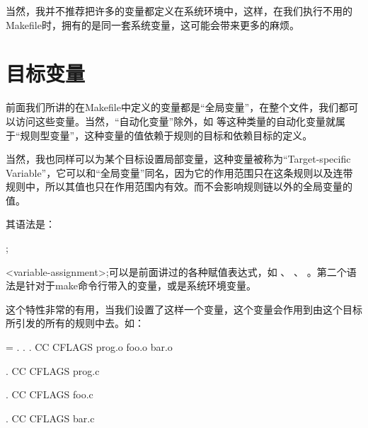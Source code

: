 \documentclass[a4paper,10pt]{sphinxmanual}
\begin{document}
当然，我并不推荐把许多的变量都定义在系统环境中，这样，在我们执行不用的Makefile时，拥有的是同一套系统变量，这可能会带来更多的麻烦。


\section{目标变量}
\label{\detokenize{variables:id8}}
前面我们所讲的在Makefile中定义的变量都是“全局变量”，在整个文件，我们都可以访问这些变量。当然，“自动化变量”除外，如 \sphinxcode{\sphinxupquote{\$\textless{}}} 等这种类量的自动化变量就属于“规则型变量”，这种变量的值依赖于规则的目标和依赖目标的定义。

当然，我也同样可以为某个目标设置局部变量，这种变量被称为“Target-specific Variable”，它可以和“全局变量”同名，因为它的作用范围只在这条规则以及连带规则中，所以其值也只在作用范围内有效。而不会影响规则链以外的全局变量的值。

其语法是：

\begin{sphinxVerbatim}[commandchars=\\\{\}]
 \PYGZlt{}\PYGZhy{}\PYGZgt{};

  \PYGZlt{}\PYGZhy{}\PYGZgt{}
\end{sphinxVerbatim}

\textless{}variable-assignment\textgreater{};可以是前面讲过的各种赋值表达式，如 \sphinxcode{\sphinxupquote{=}} 、 \sphinxcode{\sphinxupquote{:=}} 、  。第二个语法是针对于make命令行带入的变量，或是系统环境变量。

这个特性非常的有用，当我们设置了这样一个变量，这个变量会作用到由这个目标所引发的所有的规则中去。如：

\begin{sphinxVerbatim}[commandchars=\\\{\}]
  = \PYGZhy{}
 . . .
    CC CFLAGS prog.o foo.o bar.o

 .
    CC CFLAGS prog.c

 .
    CC CFLAGS foo.c

 .
    CC CFLAGS bar.c
\end{sphinxVerbatim}
\end{document}
